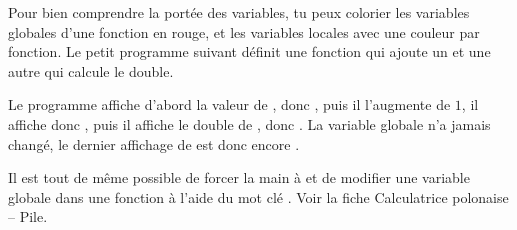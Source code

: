 \documentclass[11pt,class=report,crop=false]{standalone}
\begin{document}
\begin{cours}
\begin{itemize}
\end{itemize}


Pour bien comprendre la portée des variables, tu peux colorier les variables globales d'une fonction en rouge, et les variables locales avec une couleur par fonction.
Le petit programme suivant définit une fonction qui ajoute un et une autre qui calcule le double.


Le programme affiche d'abord la valeur de , donc , puis il l'augmente de $1$, il affiche donc , puis il affiche le double de , donc . La variable globale  n'a jamais changé, le dernier affichage de  est donc encore .

\bigskip

Il est tout de même possible de forcer la main à \Python{} et de modifier une variable globale dans une fonction à l'aide du mot clé . Voir la fiche \og{}Calculatrice polonaise -- Pile\fg{}.

\end{cours}
\end{document}

